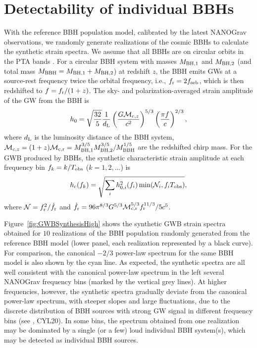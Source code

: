 \documentclass[twocolumn]{aastex631}
\newcommand{\calM}{{\mathcal{M}}}
\newcommand{\calN}{{\mathcal{N}}}
\newcommand{\rmcz}{_{{\rm c},z}}
\newcommand{\rmcr}{_{{\rm c,r}}}
\newcommand{\rmc}{_{\rm c}}
\newcommand{\rmr}{_{\rm r}}
\newcommand{\orb}{_{\rm orb}}
\newcommand{\obs}{_{\rm obs}}
\begin{document}
\section{Detectability of individual BBHs}
%
\label{sec:detectability}

With the reference BBH population model, calibrated by the latest NANOGrav
observations, we randomly generate realizations of the cosmic BBHs to calculate
the synthetic strain spectra. We assume that all BBHs are on circular orbits in
the PTA bands \citep{Phinney01}. For a circular BBH system with masses
$M_{\rm BH,1}$ and $M_{\rm BH,2}$ (and total mass
$M_{\rm BBH}=M_{\rm BH,1}+M_{\rm BH,2}$) at redshift $z$, the BBH emits
GWs at a source-rest frequency twice the orbital frequency, i.e., $f\rmr =
2f\orb$, which is then redshifted to $f=f\rmr/(1+z)$. The sky- and
polarization-averaged strain amplitude of the GW from the BBH is 
%
\begin{equation}
%
h_0 = \sqrt{\frac{32}{5}}\frac{1}{d_{\rm L}}
%
\left(\frac{G\calM\rmcz}{c^2}\right)^{5/3}
%
\left(\frac{\pi f}{c}\right)^{2/3},
%
\label{eq:h0}
%
\end{equation}
where $d_{\rm L}$ is the luminosity distance of the BBH system, $\calM\rmcz =
(1+z)\calM\rmcr =
M_{\rm BH,1}^{3/5}M_{\rm BH,2}^{3/5}/M_{\rm BBH}^{1/5}$ are the
redshifted chirp mass. For the GWB produced by BBHs, the synthetic
characteristic strain amplitude at each frequency bin $f_k=k/T\obs$
($k=1,2,...$) is
%
\begin{equation}
%
h\rmc(f_k) = \sqrt{\sum_i h_{0,i}^2(f_i)\min(\calN_i,f_iT\obs)},
%
\label{eq:hc}
%
\end{equation}
where $\calN=f\rmr^2/\dot{f\rmr}$ and
%
$\dot{f\rmr} = 96\pi^{8/3}G^{5/3}\calM\rmcr^{5/3}f\rmr^{11/3}/5c^5$.
%

Figure~\ref{fig:GWBSynthesisHigh} shows the synthetic GWB strain spectra
obtained for $10$ realizations of the BBH population randomly generated from the
reference BBH model (lower panel, each realization represented by a black
curve). For comparison, the canonical $-2/3$ power-law spectrum for the same BBH
model is also shown by the cyan line. As expected, the synthetic spectra are all
well consistent with the canonical power-law spectrum in the left several
NANOGrav frequency bins (marked by the vertical grey lines). At higher
frequencies, however, the synthetic spectra gradually deviate from the canonical
power-law spectrum, with steeper slopes and large fluctuations, due to the
discrete distribution of BBH sources with strong GW signal in different
frequency bins (see \citealt{Sesana08, Roebber16}, CYL20). In some bins, the
spectrum obtained from one realization may be dominated by a single (or a few)
loud individual BBH system(s), which may be detected as individual BBH sources.
\end{document}
